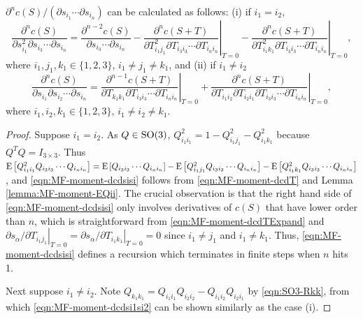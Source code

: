 \begin{theorem} \label{thm:MF-moment-dcds}
	$\partial^n c(S) / (\partial s_{i_1} \cdots \partial s_{i_n})$ can be calculated as follows: (i) if $i_1 = i_2$,
	\begin{equation} \label{eqn:MF-moment-dcdsisi}
		\frac{\partial^n c(S)}{\partial s_{i_1}^2 \partial s_{i_3} \cdots \partial s_{i_n}} = \frac{\partial^{n-2} c(S)}{\partial s_{i_3} \cdots \partial s_{i_n}} - \left. \frac{\partial^n c(S+T)}{\partial T_{i_1j_1}^2 \partial T_{i_3i_3} \cdots \partial T_{i_ni_n}} \right|_{T=0} - \left. \frac{\partial^n c(S+T)}{\partial T_{i_1k_1}^2 \partial T_{i_3i_3} \cdots \partial T_{i_ni_n}} \right|_{T=0},
	\end{equation}
	where $i_1,j_1,k_1 \in \{1,2,3\}$, $i_1 \neq j_1 \neq k_1$, and (ii) if $i_1 \neq i_2$
	\begin{equation}\label{eqn:MF-moment-dcdsi1si2}
		\frac{\partial^n c(S)}{\partial s_{i_1} \partial s_{i_2} \cdots \partial s_{i_n}} = \left. \frac{\partial^{n-1} c(S+T)}{\partial T_{k_1k_1} \partial T_{i_3i_3} \cdots \partial T_{i_ni_n}} \right|_{T=0} + \left. \frac{\partial^n c(S+T)}{\partial T_{i_1i_2} \partial T_{i_2i_1} \partial T_{i_3i_3} \cdots \partial T_{i_ni_n}} \right|_{T=0},
	\end{equation}
	where $i_1,i_2,k_1 \in \{1,2,3\}$, $i_1\neq i_2\neq k_1$.
\end{theorem}
\begin{proof}
	Suppose $i_1=i_2$. 
	As $Q\in\mathrm{SO}(3)$, $Q_{i_1i_1}^2 = 1 - Q_{i_1j_1}^2 - Q_{i_1k_1}^2$ because $Q^TQ=I_{3\times 3}$.
	Thus $\mathrm{E}\left[ Q_{i_1i_1}^2Q_{i_3i_3} \cdots Q_{i_ni_n} \right] = \mathrm{E}\left[ Q_{i_3i_3} \cdots Q_{i_ni_n} \right] - \mathrm{E}\left[ Q_{i_1j_1}^2Q_{i_3i_3} \cdots Q_{i_ni_n} \right] - \mathrm{E}\left[ Q_{i_1k_1}^2Q_{i_3i_3} \cdots Q_{i_ni_n} \right]$, and \eqref{eqn:MF-moment-dcdsisi} follows from \eqref{eqn:MF-moment-dcdT} and Lemma \ref{lemma:MF-moment-EQii}.
	The crucial observation is that the right hand side of \eqref{eqn:MF-moment-dcdsisi} only involves derivatives of $c(S)$ that have lower order than $n$, which is straightforward from \eqref{eqn:MF-moment-dcdTExpand} and $\left.\partial s_\alpha / \partial T_{i_1j_1}\right|_{T=0} = \left.\partial s_\alpha / \partial T_{i_1k_1}\right|_{T=0} = 0$ since $i_1 \neq j_1$ and $i_1 \neq k_1$.
	Thus, \eqref{eqn:MF-moment-dcdsisi} defines a recursion which terminates in finite steps when $n$ hits 1.
	
	Next suppose $i_1\neq i_2$.
	Note $Q_{k_1k_1} = Q_{i_1i_1}Q_{i_2i_2}-Q_{i_1i_2}Q_{i_2i_1}$ by \eqref{eqn:SO3-Rkk}, from which \eqref{eqn:MF-moment-dcdsi1si2} can be shown similarly as the case (i).
\end{proof}

